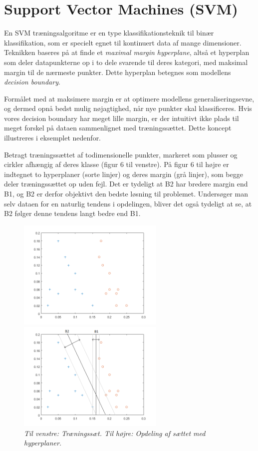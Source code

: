 \documentclass{article}
\begin{document}
\section{Support Vector Machines (SVM)}

En SVM træningsalgoritme er en type klassifikationsteknik til binær klassifikation, som er specielt egnet til kontinuert data af mange dimensioner. Teknikken baseres på at finde et \textit{maximal margin hyperplane}, altså et hyperplan som deler datapunkterne op i to dele svarende til deres kategori, med maksimal margin til de nærmeste punkter. Dette hyperplan betegnes som modellens \textit{decision boundary}.

Formålet med at maksimere margin er at optimere modellens generaliseringsevne, og dermed opnå bedst mulig nøjagtighed, når nye punkter skal klassificeres. Hvis vores decision boundary har meget lille margin, er der intuitivt ikke plads til meget forskel på dataen sammenlignet med træningssættet. Dette koncept illustreres i eksemplet nedenfor.

Betragt træningssættet af todimensionelle punkter, markeret som plusser og cirkler afhængig af deres klasse (figur 6 til venstre). På figur 6 til højre er indtegnet to hyperplaner (sorte linjer) og deres margin (grå linjer), som begge deler træningssættet op uden fejl. Det er tydeligt at B2 har bredere margin end B1, og B2 er derfor objektivt den bedste løsning til problemet. Undersøger man selv dataen for en naturlig tendens i opdelingen, bliver det også tydeligt at se, at B2 følger denne tendens langt bedre end B1.

\begin{figure}[H]
	\begin{minipage}[t]{0.6\linewidth}
		\includegraphics[width=7cm]{maximal_margin_hyperplane_1}
	\end{minipage}
	\begin{minipage}[t]{0.1\linewidth}
		\includegraphics[width=7cm]{maximal_margin_hyperplane_2}
	\end{minipage}
	\caption{\textit{Til venstre: Træningssæt. Til højre: Opdeling af sættet med hyperplaner.}}
\end{figure}
\end{document}
